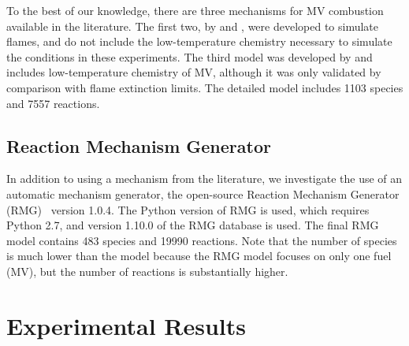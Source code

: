 \documentclass[12pt]{../ussci}
\begin{document}
To the best of our knowledge, there are three mechanisms for MV combustion
available in the literature. The first two, by \textcite{Dmitriev2015} and
\textcite{Korobeinichev2015}, were developed to simulate flames, and do not
include the low-temperature chemistry necessary to simulate the conditions in
these experiments. The third model was developed by \textcite{Dievart2013} and
includes low-temperature chemistry of MV, although it was only validated by
comparison with flame extinction limits.
The detailed \textcite{Dievart2013} model includes 1103 species and 7557
reactions.

\subsection{Reaction Mechanism Generator}\label{sec:reaction-mechanism-generator}

In addition to using a mechanism from the literature, we investigate the use of
an automatic mechanism generator, the open-source Reaction Mechanism Generator
(RMG)~\autocite{Allen2012} version 1.0.4. The Python version of RMG is used,
which requires Python 2.7, and version 1.10.0 of the RMG database is used. The
final RMG model contains 483 species and 19990 reactions. Note that the number
of species is much lower than the \textcite{Dievart2013} model because the RMG
model focuses on only one fuel (MV), but the number of reactions is
substantially higher.

\section{Experimental Results}\label{sec:experimental-results}
\end{document}
